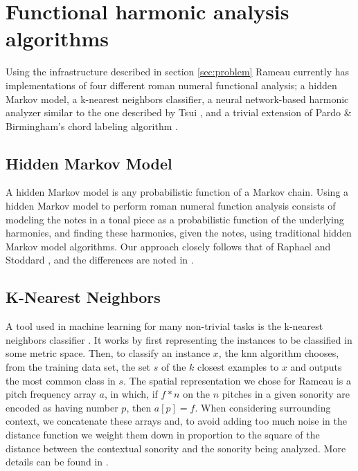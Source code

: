 \section{Functional harmonic analysis algorithms}
\label{sec:algorithms}

Using the infrastructure described in section \ref{sec:problem}
Rameau currently has implementations of four different roman numeral
functional analysis; a hidden Markov model, a k-nearest neighbors
classifier, a neural network-based harmonic analyzer similar to the
one described by Tsui \cite{tsui02:harmonic}, and a trivial extension
of Pardo \& Birmingham's chord labeling algorithm
\cite{pardo.ea99:automated}.

\subsection{Hidden Markov Model}
\label{sec:hidden-markov-model}

A hidden Markov model is any probabilistic function of a Markov
chain. Using a hidden Markov model to perform roman numeral function
analysis consists of modeling the notes in a tonal piece as a
probabilistic function of the underlying harmonies, and finding these
harmonies, given the notes, using traditional hidden Markov model
algorithms. Our approach closely follows that of Raphael and Stoddard
\cite{raphael.ea03:harmonic}, and the differences are noted in
\cite{passos08:modelos}.


\subsection{K-Nearest Neighbors}
\label{sec:knn}

A tool used in machine learning for many non-trivial tasks is the
k-nearest neighbors classifier \cite{mitchell97:machine}. It works by
first representing the instances to be classified in some metric
space. Then, to classify an instance $x$, the knn algorithm chooses,
from the training data set, the set $s$ of the $k$ closest examples to
$x$ and outputs the most common class in $s$. The spatial
representation we chose for Rameau is a pitch frequency array $a$, in
which, if $f*n$ on the $n$ pitches in a given sonority are encoded as
having number $p$, then $a[p] = f$. When considering surrounding
context, we concatenate these arrays and, to avoid adding too much
noise in the distance function we weight them down in proportion to
the square of the distance between the contextual sonority and the
sonority being analyzed. More details can be found in
\cite{passos08:modelos}.


